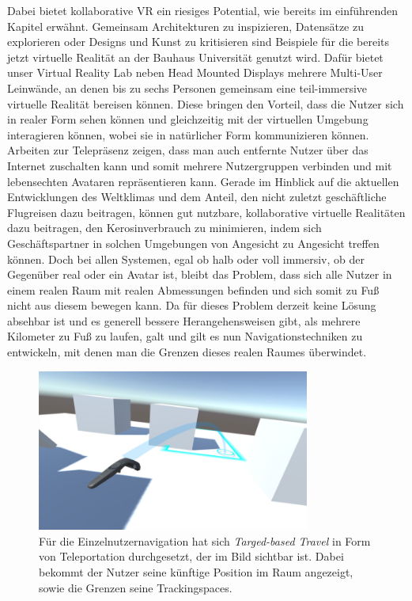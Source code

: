 Dabei bietet kollaborative VR ein riesiges Potential, wie bereits im einführenden Kapitel erwähnt. Gemeinsam Architekturen zu inspizieren, Datensätze zu explorieren oder Designs und Kunst zu kritisieren sind Beispiele für die bereits jetzt virtuelle Realität an der Bauhaus Universität genutzt wird. Dafür bietet unser Virtual Reality Lab neben Head Mounted Displays mehrere Multi-User Leinwände, an denen bis zu sechs Personen gemeinsam eine teil-immersive virtuelle Realität bereisen können\cite{Kulik2011C1x6}. Diese bringen den Vorteil, dass die Nutzer sich in realer Form sehen können und gleichzeitig mit der virtuellen Umgebung interagieren können, wobei sie in natürlicher Form kommunizieren können.
Arbeiten zur Telepräsenz\cite{BeckImmersiveTelepresence} zeigen, dass man auch entfernte Nutzer über das Internet zuschalten kann und somit mehrere Nutzergruppen verbinden und mit lebensechten Avataren repräsentieren kann. 
Gerade im Hinblick auf die aktuellen Entwicklungen des Weltklimas und dem Anteil, den nicht zuletzt geschäftliche Flugreisen dazu beitragen, können gut nutzbare, kollaborative virtuelle Realitäten dazu beitragen, den Kerosinverbrauch zu minimieren, indem sich Geschäftspartner in solchen Umgebungen \glqq von Angesicht zu Angesicht \grqq{} treffen können.
Doch bei allen Systemen, egal ob halb oder voll immersiv, ob der Gegenüber real oder ein Avatar ist, bleibt das Problem, dass sich alle Nutzer in einem realen Raum mit realen Abmessungen befinden und sich somit zu Fuß nicht aus diesem bewegen kann. Da für dieses Problem derzeit keine Lösung absehbar ist und es generell bessere Herangehensweisen gibt, als mehrere Kilometer zu Fuß zu laufen, galt und gilt es nun Navigationstechniken zu entwickeln, mit denen man die Grenzen dieses realen Raumes überwindet.

\begin{figure}[H]
	\centering
		\includegraphics[width=0.8\textwidth]{images/steam_teleport.jpg}
	\caption{Für die Einzelnutzernavigation hat sich \textit{Targed-based Travel} in Form von Teleportation durchgesetzt, der im Bild sichtbar ist. Dabei bekommt der Nutzer seine künftige Position im Raum angezeigt, sowie die Grenzen seine Trackingspaces.}
\end{figure}


